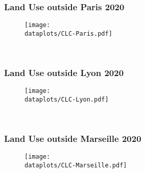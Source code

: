 \documentclass[aspectratio=169]{beamer}
\begin{document}
\beginbackup




\begin{frame}[label=LandUseMeasureParis]
	\frametitle{Land Use outside Paris 2020}
	\begin{figure}
		\begin{center}
			\texttt{[image: \\dataplots/CLC-Paris.pdf]}
		\end{center}
	\end{figure}
	\hspace{-1cm}
	\hyperlink{CLCmeasure}{}\\
\end{frame}

\begin{frame}[label=LandUseMeasureLyon]
	\frametitle{Land Use outside Lyon 2020}
	\begin{figure}
		\begin{center}
			\texttt{[image: \\dataplots/CLC-Lyon.pdf]}
		\end{center}
	\end{figure}
	\hspace{-1cm}
	\hyperlink{CLCmeasure}{}\\
\end{frame}

\begin{frame}[label=LandUseMeasureMarseille]
	\frametitle{Land Use outside Marseille 2020}
	\begin{figure}
		\begin{center}
			\texttt{[image: \\dataplots/CLC-Marseille.pdf]}
		\end{center}
	\end{figure}
	\hspace{-1cm}
	\hyperlink{CLCmeasure}{}\\
\end{frame}
\end{document}
